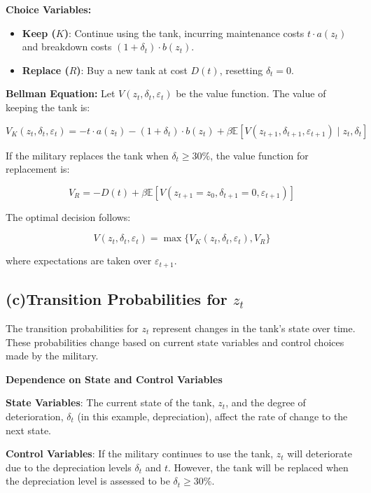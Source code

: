 \documentclass{article}
\begin{document}
\textbf{Choice Variables:}
\begin{itemize}
    \item \textbf{Keep (\( K \))}: Continue using the tank, incurring maintenance costs \( t \cdot a(z_t) \) and breakdown costs \( (1+\delta_t) \cdot b(z_t) \).
    \item \textbf{Replace (\( R \))}: Buy a new tank at cost \( D(t) \), resetting \( \delta_t = 0 \).
\end{itemize}

\textbf{Bellman Equation:}  
Let \( V(z_t, \delta_t, \varepsilon_t) \) be the value function. The value of keeping the tank is:

\[
V_K(z_t, \delta_t, \varepsilon_t) = - t \cdot a(z_t) - (1+\delta_t) \cdot b(z_t) + \beta \mathbb{E} \left[ V(z_{t+1}, \delta_{t+1}, \varepsilon_{t+1}) \mid z_t, \delta_t \right]
\]

If the military replaces the tank when \( \delta_t \geq 30\% \), the value function for replacement is:

\[
V_R = - D(t) + \beta \mathbb{E} \left[ V(z_{t+1} = z_0, \delta_{t+1} = 0, \varepsilon_{t+1}) \right]
\]

The optimal decision follows:

\[
V(z_t, \delta_t, \varepsilon_t) = \max \{ V_K(z_t, \delta_t, \varepsilon_t), V_R \}
\]

where expectations are taken over \( \varepsilon_{t+1} \).

\subsection*{(c)Transition Probabilities for \( z_t \)}

The transition probabilities for \( z_t \) represent changes in the tank's state over time. These probabilities change based on current state variables and control choices made by the military.

\textbf{Dependence on State and Control Variables}

\textbf{State Variables}: The current state of the tank, \( z_t \), and the degree of deterioration, \( \delta_t \) (in this example, depreciation), affect the rate of change to the next state.

\textbf{Control Variables}: If the military continues to use the tank, \( z_t \) will deteriorate due to the depreciation levels \( \delta_t \) and \( t \). However, the tank will be replaced when the depreciation level is assessed to be \( \delta_t \geq 30\% \).
\end{document}
